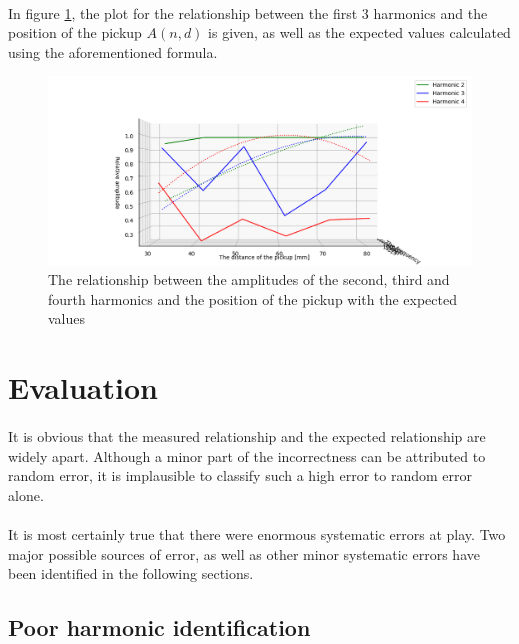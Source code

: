 \documentclass{article}
\begin{document}
\paragraph*{}
In figure \ref{fig:final-graph-e}, the plot for the relationship between the
first $3$ harmonics and the position of the pickup $A(n, d)$ is given, as well
as the expected values calculated using the aforementioned formula.
\begin{figure}[ht]
	\centering
	\includegraphics[width=\textwidth]{img/final-graph-e}
	\caption{The relationship between the amplitudes of the second, third and 
		fourth harmonics and the position of the pickup with the expected values}
	\label{fig:final-graph-e}
\end{figure}

\section{Evaluation}

\paragraph*{}
It is obvious that the measured relationship and the expected relationship are
widely apart. Although a minor part of the incorrectness can be attributed to
random error, it is implausible to classify such a high error to random error
alone.

\paragraph*{}
It is most certainly true that there were enormous systematic errors at play.
Two major possible sources of error, as well as other minor systematic errors
have been identified in the following sections.

\subsection{Poor harmonic identification}
\end{document}
